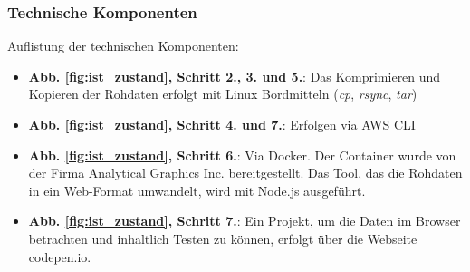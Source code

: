 \subsubsection{Technische Komponenten}
Auflistung der technischen Komponenten:
\begin{itemize}
\item \textbf{Abb. \ref{fig:ist_zustand}, Schritt 2., 3. und 5.}: Das Komprimieren und Kopieren der Rohdaten erfolgt mit Linux Bordmitteln (\emph{cp}, \emph{rsync}, \emph{tar})
\item \textbf{Abb. \ref{fig:ist_zustand}, Schritt 4. und 7.}: Erfolgen via AWS CLI
\item \textbf{Abb. \ref{fig:ist_zustand}, Schritt 6.}: Via Docker. Der Container wurde von der Firma Analytical Graphics Inc. \cite{AGI2010} bereitgestellt. Das Tool, das die Rohdaten in ein Web-Format umwandelt, wird mit Node.js ausgeführt.
\item \textbf{Abb. \ref{fig:ist_zustand}, Schritt 7.}: Ein Projekt, um die Daten im Browser betrachten und inhaltlich Testen zu können, erfolgt über die Webseite codepen.io.
\end{itemize}


